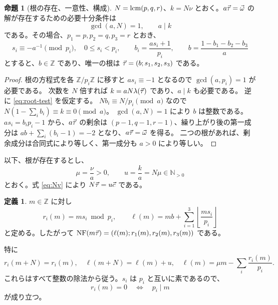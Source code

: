 \documentclass[11pt,a4paper]{ltjsarticle}
\numberwithin{equation}{section}
\theoremstyle{definition}
\newtheorem{proposition}[theorem]{命題}
\newtheorem{definition}[theorem]{定義}
\newcommand{\Z}{\mathbb Z}\newcommand{\N}{\mathbb N}\newcommand{\Q}{\mathbb Q}\newcommand{\C}{\mathbb C}
\begin{document}
\begin{proposition}[根の存在、一意性、構成]\label{prop:root}
$N=\operatorname{lcm}(p,q,r)$、$k=N\nu$ とおく。$a\vec\tau=\vec\omega$ の解が存在するための必要十分条件は
\begin{equation}\label{eq:root-test}
 \gcd(a,N)=1,\qquad a\mid k
\end{equation}
である。その場合、$p_1=p,p_2=q,p_3=r$ とおき、
\begin{equation}\label{eq:root-formula}
 s_i\equiv-a^{-1}\pmod{p_i},\quad 0\le s_i<p_i,\qquad
 b_i=\frac{as_i+1}{p_i},\qquad b=\frac{1-b_1-b_2-b_3}{a}
\end{equation}
とすると、$b\in\Z$ であり、唯一の根は $\vec\tau=(b;s_1,s_2,s_3)$ である。
\end{proposition}
\begin{proof}
根の方程式を各 $\Z/p_i\Z$ に移すと $as_i\equiv-1$ となるので $\gcd(a,p_i)=1$ が必要である。
次数を $N$ 倍すれば $k=aN\lambda(\vec\tau)$ であり、$a\mid k$ も必要である。
逆に \eqref{eq:root-test} を仮定する。
$N b_i\equiv N/p_i\pmod a$ なので
$N(1-\sum_i b_i)\equiv k\equiv0\pmod a$。
$\gcd(a,N)=1$ により $b$ は整数である。
$a s_i=b_i p_i-1$ から、$a\vec\tau$ の剰余は $(p-1,q-1,r-1)$、繰り上がり後の第一成分は
$ab+\sum_i(b_i-1)=-2$ となり、$a\vec\tau=\vec\omega$ を得る。
二つの根があれば、剰余成分は合同式により等しく、第一成分も $a>0$ により等しい。
\end{proof}
以下、根が存在するとし、
\begin{equation}\label{eq:mu-u}
 \mu=\frac{\nu}{a}>0,\qquad u=\frac{k}{a}=N\mu\in\N_{>0}
\end{equation}
とおく。式 \eqref{eq:Nv} により $N\vec\tau=u\vec c$ である。

\begin{definition}\label{def:ell}
$m\in\Z$ に対し
\begin{equation}\label{eq:ell}
 r_i(m)=ms_i\bmod p_i,\qquad
 \ell(m)=mb+\sum_{i=1}^3\left\lfloor\frac{ms_i}{p_i}\right\rfloor
\end{equation}
と定める。したがって $\operatorname{NF}(m\vec\tau)=(\ell(m);r_1(m),r_2(m),r_3(m))$ である。
\end{definition}
特に
\begin{equation}\label{eq:period}
 r_i(m+N)=r_i(m),\quad \ell(m+N)=\ell(m)+u,\quad
 \ell(m)=\mu m-\sum_i\frac{r_i(m)}{p_i}.
\end{equation}
これらはすべて整数の除法から従う。$s_i$ は $p_i$ と互いに素であるので、
\begin{equation}\label{eq:faithful-residue}
 r_i(m)=0\quad\Longleftrightarrow\quad p_i\mid m
\end{equation}
が成り立つ。
\end{document}
